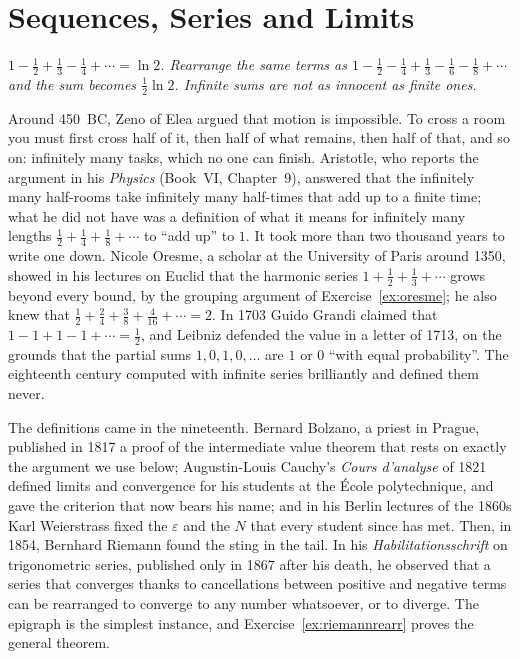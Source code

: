 \chapter{Sequences, Series and Limits}

\begin{center}\itshape
$1-\frac12+\frac13-\frac14+\cdots=\ln2$. Rearrange the same terms as $1-\frac12-\frac14+\frac13-\frac16-\frac18+\cdots$\\
and the sum becomes $\frac12\ln2$. Infinite sums are not as innocent as finite ones.
\end{center}

Around 450~BC, Zeno of Elea argued that motion is impossible. To cross a room you must first cross half of it, then half of what remains, then half
of that, and so on: infinitely many tasks, which no one can finish. Aristotle, who reports the argument in his \emph{Physics} (Book~VI, Chapter~9), answered that
the infinitely many half-rooms take infinitely many half-times that add up to a finite time; what he did not have was a definition of what it means
for infinitely many lengths $\frac12+\frac14+\frac18+\cdots$ to ``add up'' to $1$. It took more than two thousand years to write one down. Nicole
Oresme, a scholar at the University of Paris around 1350, showed in his lectures on Euclid that the harmonic series $1+\frac12+\frac13+\cdots$ grows
beyond every bound, by the grouping argument of Exercise~\ref{ex:oresme}; he also knew that $\frac12+\frac24+\frac38+\frac4{16}+\cdots=2$. In 1703 Guido Grandi
claimed that $1-1+1-1+\cdots=\frac12$, and Leibniz defended the value in a letter of 1713, on the grounds that the partial sums $1,0,1,0,\dots$ are
$1$ or $0$ ``with equal probability''. The eighteenth century computed with infinite series brilliantly and defined them never.

The definitions came in the nineteenth. Bernard Bolzano, a priest in Prague, published in 1817 a proof of the intermediate value theorem that
rests on exactly the argument we use below; Augustin-Louis Cauchy's \emph{Cours d'analyse} of 1821 defined limits and convergence for his students at
the \'Ecole polytechnique, and gave the criterion that now bears his name; and in his Berlin lectures of the 1860s Karl Weierstrass fixed the
$\varepsilon$ and the $N$ that every student since has met. Then, in 1854, Bernhard Riemann found the sting in the tail. In his
\emph{Habilitationsschrift} on trigonometric series, published only in 1867 after his death, he observed that a series that converges thanks to
cancellations between positive and negative terms can be rearranged to converge to any number whatsoever, or to diverge. The epigraph is the
simplest instance, and Exercise~\ref{ex:riemannrearr} proves the general theorem.

